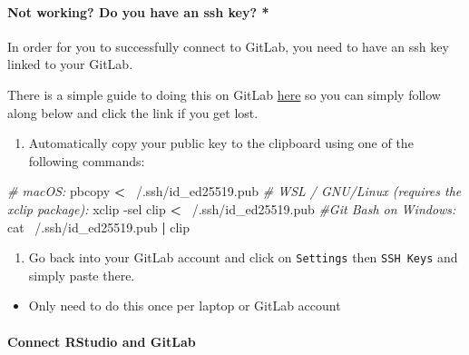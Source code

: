 \documentclass[openany]{article}
\newenvironment{Shaded}{\begin{snugshade}}{\end{snugshade}}
\newcommand{\CommentTok}[1]{\textcolor[rgb]{0.56,0.35,0.01}{\textit{#1}}}
\newcommand{\ExtensionTok}[1]{#1}
\newcommand{\FunctionTok}[1]{\textcolor[rgb]{0.00,0.00,0.00}{#1}}
\newcommand{\KeywordTok}[1]{\textcolor[rgb]{0.13,0.29,0.53}{\textbf{#1}}}
\newcommand{\NormalTok}[1]{#1}
\newcommand{\OperatorTok}[1]{\textcolor[rgb]{0.81,0.36,0.00}{\textbf{#1}}}
\providecommand{\tightlist}{%
  \setlength{\itemsep}{0pt}\setlength{\parskip}{0pt}}
\let\oldparagraph\paragraph
\renewcommand{\paragraph}[1]{\oldparagraph{#1}\mbox{}}
\begin{document}
\hypertarget{not-working-do-you-have-an-ssh-key}{%
\paragraph{Not working? Do you have an ssh key? *}\label{not-working-do-you-have-an-ssh-key}}

In order for you to successfully connect to GitLab, you need to have an ssh key linked to your GitLab.

There is a simple guide to doing this on GitLab \href{http://ceres.agios.com/help/ssh/README\#generating-a-new-ssh-key-pair}{here} so you can simply follow along below and click the link if you get lost.

\begin{enumerate}
\def\labelenumi{\arabic{enumi}.}
\tightlist
\item
  Automatically copy your public key to the clipboard using one of the following commands:
\end{enumerate}

\begin{Shaded}
\begin{Highlighting}[]
\CommentTok{# macOS:}
\ExtensionTok{pbcopy} \OperatorTok{<}\NormalTok{ ~/.ssh/id_ed25519.pub}
\CommentTok{# WSL / GNU/Linux (requires the xclip package):}
\ExtensionTok{xclip}\NormalTok{ -sel clip }\OperatorTok{<}\NormalTok{ ~/.ssh/id_ed25519.pub}
\CommentTok{#Git Bash on Windows:}
\FunctionTok{cat}\NormalTok{ ~/.ssh/id_ed25519.pub }\KeywordTok{|} \ExtensionTok{clip}
\end{Highlighting}
\end{Shaded}

\begin{enumerate}
\def\labelenumi{\arabic{enumi}.}
\setcounter{enumi}{1}
\tightlist
\item
  Go back into your GitLab account and click on \texttt{Settings} then \texttt{SSH\ Keys} and simply paste there.
\end{enumerate}

\begin{itemize}
\tightlist
\item
  Only need to do this once per laptop or GitLab account
\end{itemize}

\hypertarget{connect-rstudio-and-gitlab}{%
\paragraph{Connect RStudio and GitLab}\label{connect-rstudio-and-gitlab}}
\end{document}
